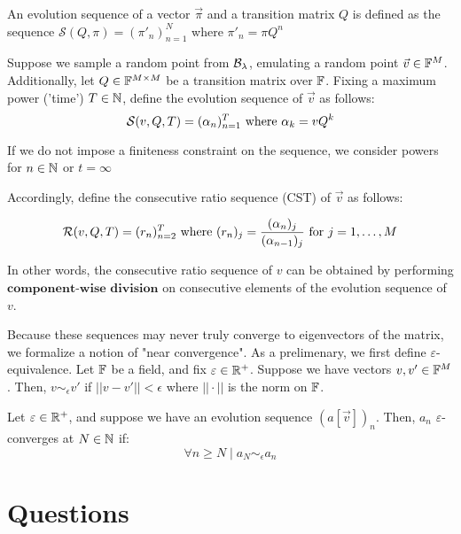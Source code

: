 \begin{definition}
An evolution sequence of a vector $\vec{\pi}$ and a transition matrix $Q$ is defined as the sequence $\mathcal{S}(Q,\pi) = ( \pi'_n )_{n=1}^N$ where $ \pi'_n  = \pi Q^n$
\end{definition}

\begin{definition}
Suppose we sample a random point from $\B_\lambda$, emulating a random point $\vec{v} \in \F^M$. Additionally, let $Q \in \F^{M \times M}$ be a transition matrix over $\F$. Fixing a maximum power ('time') $T \in \N$, define the evolution sequence of $\vec{v}$ as follows:
$$\Seq(v, Q, T) = (\alpha_n)_{n=1}^T \text{ where } \alpha_k = {v}Q^k$$

If we do not impose a finiteness constraint on the sequence, we consider powers for $n \in \N$ or $t = \infty$
\end{definition}


\begin{definition}

Accordingly, define the consecutive ratio sequence (CST) of $\vec{v}$ as follows:

$$\Rseq(v, Q, T) = (r_n)_{n=2}^T \text{ where } (r_n)_j = \frac{(\alpha_n)_j}{(\alpha_{n-1})_j} \text{ for } j = \oneto[M]$$

In other words, the consecutive ratio sequence of $v$ can be obtained by performing $\textbf{component-wise division}$ on consecutive elements of the evolution sequence of $v$.
\end{definition}

\begin{definition}

Because these sequences may never truly converge to eigenvectors of the matrix, we formalize a notion of "near convergence". As a prelimenary, we first define $\varepsilon$-equivalence. Let $\F$ be a field, and fix $\varepsilon \in \R^+$. Suppose we have vectors $v, v' \in \F^M$. Then, $v \sim_\epsilon v'$ if $||v - v'|| < \epsilon$ where $|| \cdot ||$ is the norm on $\F$.
\end{definition}

Let $\varepsilon \in \R^+$, and suppose we have an evolution sequence $(a[\vec{v}])_n$. Then, $a_n$ $\varepsilon$-converges at $N \in \N$ if:
$$\forall n \geq N \mid  a_N \sim_\epsilon a_n$$

\newpage

\section{Questions}

